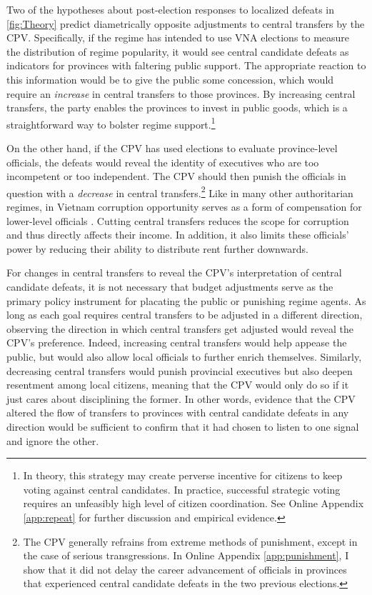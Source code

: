 \documentclass[12pt]{article}
\newcommand\fnote[1]{\footnote{\baselineskip=2\normalbaselineskip#1}}
\newcommand{\1}{\mathbbm{1}}
\begin{document}
Two of the hypotheses about post-election responses to localized defeats in \autoref{fig:Theory} predict diametrically opposite adjustments to central transfers by the CPV. Specifically, if the regime has intended to use VNA elections to measure the distribution of regime popularity, it would see central candidate defeats as indicators for provinces with faltering public support. The appropriate reaction to this information would be to give the public some concession, which would require an \textit{increase} in central transfers to those provinces. By increasing central transfers, the party enables the provinces to invest in public goods, which is a straightforward way to bolster regime support.\fnote{In theory, this strategy may create perverse incentive for citizens to keep voting against central candidates. In practice, successful strategic voting requires an unfeasibly high level of citizen coordination. See Online Appendix \ref{app:repeat} for further discussion and empirical evidence.}

On the other hand, if the CPV has used elections to evaluate province-level officials, the defeats would reveal the identity of executives who are too incompetent or too independent. The CPV should then punish the officials in question with a \textit{decrease} in central transfers.\fnote{The CPV generally refrains from extreme methods of punishment, except in the case of serious transgressions. In Online Appendix \ref{app:punishment}, I show that it did not delay the career advancement of officials in provinces that experienced central candidate defeats in the two previous elections.} Like in many other authoritarian regimes, in Vietnam corruption opportunity serves as a form of compensation for lower-level officials \citep{Darden2008}. Cutting central transfers reduces the scope for corruption and thus directly affects their income. In addition, it also limits these officials' power by reducing their ability to distribute rent further downwards.

For changes in central transfers to reveal the CPV's interpretation of central candidate defeats, it is not necessary that budget adjustments serve as the primary policy instrument for placating the public or punishing regime agents. As long as each goal requires central transfers to be adjusted in a different direction, observing the direction in which central transfers get adjusted would reveal the CPV's preference. Indeed, increasing central transfers would help appease the public, but would also allow local officials to further enrich themselves. Similarly, decreasing central transfers would punish provincial executives but also deepen resentment among local citizens, meaning that the CPV would only do so if it just cares about disciplining the former. In other words, evidence that the CPV altered the flow of transfers to provinces with central candidate defeats in any direction would be sufficient to confirm that it had chosen to listen to one signal and ignore the other.
\end{document}
